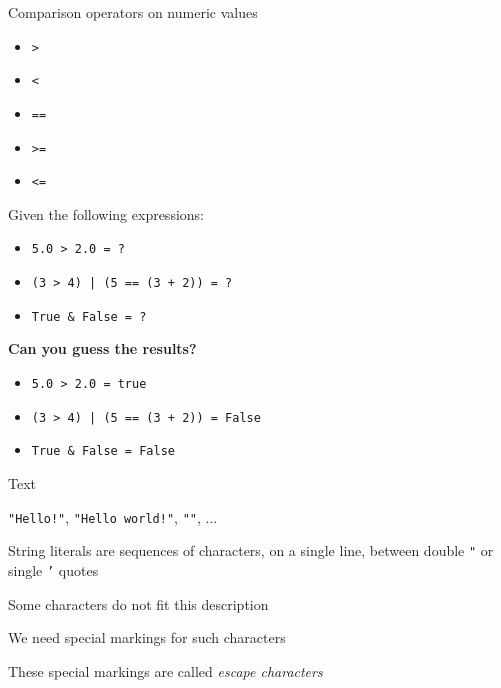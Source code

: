 \documentclass{beamer}
\begin{document}
\begin{slide}{
\item Comparison operators on numeric values
\begin{itemize}
\item \texttt{>}
\item \texttt{<}
\item \texttt{==}
\item \texttt{>=}
\item \texttt{<=}
\end{itemize}
}\end{slide}

\begin{slide}{
\item Given the following expressions:
\begin{itemize}
\item \texttt{5.0 > 2.0 = ?}
\item \texttt{(3 > 4) | (5 == (3 + 2)) = ?}
\item \texttt{True \& False = ?}
\end{itemize}
\item \textbf{Can you guess the results?}
\pause
\begin{itemize}
\item \texttt{5.0 > 2.0 = true}
\item \texttt{(3 > 4) | (5 == (3 + 2)) = False}
\item \texttt{True \& False = False}
\end{itemize}
}\end{slide}

\begin{slide}{
\item Text
\item \texttt{"Hello!"}, \texttt{"Hello world!"}, \texttt{""}, ...
}\end{slide}

\begin{slide}{
\item String literals are sequences of characters, on a single line, between double \texttt{"} or single \texttt{'} quotes 
\item Some characters do not fit this description
\item We need special markings for such characters
\item These special markings are called \textit{escape characters}
}\end{slide}
\end{document}

